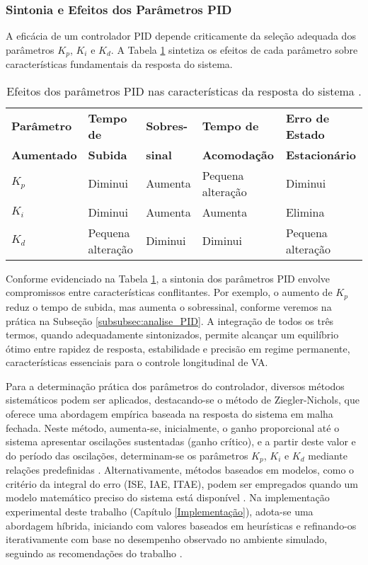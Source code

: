 \subsubsection{Sintonia e Efeitos dos Parâmetros PID} \label{subsubsec:parametrosPID}

A eficácia de um controlador PID depende criticamente da seleção adequada dos parâmetros $K_p$, $K_i$ e $K_d$. A Tabela \ref{table:PID} sintetiza os efeitos de cada parâmetro sobre características fundamentais da resposta do sistema.

\begin{table}[htbp]
\centering
\begin{tabular}{|l|l|l|l|l|}
\hline
\textbf{Parâmetro} & \textbf{Tempo de} & \textbf{Sobres-} & \textbf{Tempo de} & \textbf{Erro de Estado} \\ 
\textbf{Aumentado} & \textbf{Subida} & \textbf{sinal} & \textbf{Acomodação} & \textbf{Estacionário} \\ 
\hline
$K_p$ & Diminui & Aumenta & Pequena alteração & Diminui \\ 
$K_i$ & Diminui & Aumenta & Aumenta & Elimina \\ 
$K_d$ & Pequena alteração & Diminui & Diminui & Pequena alteração \\
\hline
\end{tabular}
\caption{Efeitos dos parâmetros PID nas características da resposta do sistema \cite[Week 5 - Lesson 1: Proportional-Integral-Derivative (PID) Control. ~8min11s]{University_of_Toronto2018-fe}.}
\label{table:PID}
\end{table}

Conforme evidenciado na Tabela \ref{table:PID}, a sintonia dos parâmetros PID envolve compromissos entre características conflitantes. Por exemplo, o aumento de $K_p$ reduz o tempo de subida, mas aumenta o sobressinal, conforme veremos na prática na Subseção \ref{subsubsec:analise_PID}. A integração de todos os três termos, quando adequadamente sintonizados, permite alcançar um equilíbrio ótimo entre rapidez de resposta, estabilidade e precisão em regime permanente, características essenciais para o controle longitudinal de VA.

Para a determinação prática dos parâmetros do controlador, diversos métodos sistemáticos podem ser aplicados, destacando-se o método de Ziegler-Nichols, que oferece uma abordagem empírica baseada na resposta do sistema em malha fechada. Neste método, aumenta-se, inicialmente, o ganho proporcional até o sistema apresentar oscilações sustentadas (ganho crítico), e a partir deste valor e do período das oscilações, determinam-se os parâmetros $K_p$, $K_i$ e $K_d$ mediante relações predefinidas \cite{University_of_Toronto2018-fe}. Alternativamente, métodos baseados em modelos, como o critério da integral do erro (ISE, IAE, ITAE), podem ser empregados quando um modelo matemático preciso do sistema está disponível \cite{Vilanova2012}. Na implementação experimental deste trabalho (Capítulo \ref{Implementação}), adota-se uma abordagem híbrida, iniciando com valores baseados em heurísticas e refinando-os iterativamente com base no desempenho observado no ambiente simulado, seguindo as recomendações do trabalho \cite{University_of_Toronto2018-fe}.

